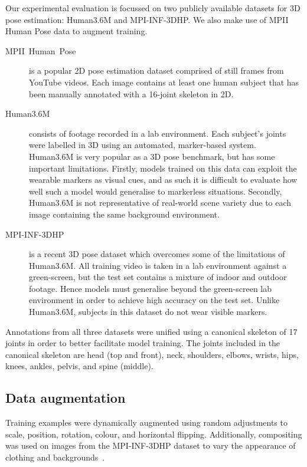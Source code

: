 \documentclass[australian,10pt,twocolumn,letterpaper,twocolumn]{article}
\begin{document}
Our experimental evaluation is focussed on two publicly available
datasets for 3D pose estimation: Human3.6M and MPI-INF-3DHP. We also
make use of MPII Human Pose data to augment training.
\begin{description}
\item [{MPII~Human~Pose~\citep{andriluka20142d}}] is a popular 2D pose
estimation dataset comprised of still frames from YouTube videos.
Each image contains at least one human subject that has been manually
annotated with a 16-joint skeleton in 2D.
\item [{Human3.6M~\citep{ionescu2014human3}}] consists of footage recorded
in a lab environment. Each subject's joints were labelled in 3D using
an automated, marker-based system. Human3.6M is very popular as a
3D pose benchmark, but has some important limitations. Firstly, models
trained on this data can exploit the wearable markers as visual cues,
and as such it is difficult to evaluate how well such a model would
generalise to markerless situations. Secondly, Human3.6M is not representative
of real-world scene variety due to each image containing the same
background environment.
\item [{MPI-INF-3DHP~\citep{mehta2017monocular}}] is a recent 3D pose
dataset which overcomes some of the limitations of Human3.6M. All
training video is taken in a lab environment against a green-screen,
but the test set contains a mixture of indoor and outdoor footage.
Hence models must generalise beyond the green-screen lab environment
in order to achieve high accuracy on the test set. Unlike Human3.6M,
subjects in this dataset do not wear visible markers.
\end{description}
Annotations from all three datasets were unified using a canonical
skeleton of 17 joints in order to better facilitate model training.
The joints included in the canonical skeleton are head (top and front),
neck, shoulders, elbows, wrists, hips, knees, ankles, pelvis, and
spine (middle).

\subsection{Data augmentation}

Training examples were dynamically augmented using random adjustments
to scale, position, rotation, colour, and horizontal flipping. Additionally,
compositing was used on images from the MPI-INF-3DHP dataset to vary
the appearance of clothing and backgrounds~\citep{mehta2017monocular,mehta2017vnect}.
\end{document}
